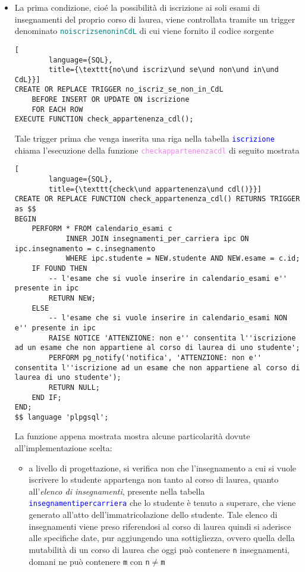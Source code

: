 \documentclass{article}
\newcommand{\tabb}[1]{\texttt{\textcolor{blue}{#1}}}
\newcommand{\sqlfunc}[1]{\texttt{\textcolor{violet}{#1}}}
\newcommand{\sqltrigger}[1]{\texttt{\textcolor{teal}{#1}}}
\newcommand{\und}[0]{\textunderscore}
\begin{document}
\begin{itemize}
    \item La prima condizione, cioé la possibilità di iscrizione ai soli esami di insegnamenti del proprio corso di laurea, viene controllata tramite un trigger denominato \sqltrigger{no\und iscriz\und se\und non\und in\und CdL} di cui viene fornito il codice sorgente
    \begin{lstlisting}[
        language={SQL},
        title={\texttt{no\und iscriz\und se\und non\und in\und CdL}}]
CREATE OR REPLACE TRIGGER no_iscriz_se_non_in_CdL
    BEFORE INSERT OR UPDATE ON iscrizione
    FOR EACH ROW
EXECUTE FUNCTION check_appartenenza_cdl();
    \end{lstlisting}
    Tale trigger prima che venga inserita una riga nella tabella \tabb{iscrizione} chiama l'esecuzione della funzione \sqlfunc{check\und appartenenza\und cdl} di seguito mostrata
    \begin{lstlisting}[
        language={SQL},
        title={\texttt{check\und appartenenza\und cdl()}}]
CREATE OR REPLACE FUNCTION check_appartenenza_cdl() RETURNS TRIGGER as $$
BEGIN
    PERFORM * FROM calendario_esami c
            INNER JOIN insegnamenti_per_carriera ipc ON ipc.insegnamento = c.insegnamento
            WHERE ipc.studente = NEW.studente AND NEW.esame = c.id;
    IF FOUND THEN
        -- l'esame che si vuole inserire in calendario_esami e'' presente in ipc
        RETURN NEW;
    ELSE
        -- l'esame che si vuole inserire in calendario_esami NON e'' presente in ipc
        RAISE NOTICE 'ATTENZIONE: non e'' consentita l''iscrizione ad un esame che non appartiene al corso di laurea di uno studente';
        PERFORM pg_notify('notifica', 'ATTENZIONE: non e'' consentita l''iscrizione ad un esame che non appartiene al corso di laurea di uno studente');
        RETURN NULL;
    END IF;
END;
$$ language 'plpgsql';
    \end{lstlisting}
    La funzione appena mostrata mostra alcune particolarità dovute all'implementazione scelta:
    \begin{itemize}
        \item a livello di progettazione, si verifica non che l'insegnamento a cui si vuole iscrivere lo studente appartenga non tanto al corso di laurea, quanto all'\textit{elenco di insegnamenti}, presente nella tabella \tabb{insegnamenti\und per\und carriera} che lo studente è tenuto a superare, che viene generato all'atto dell'immatricolazione dello studente. Tale elenco di insegnamenti viene preso riferendosi al corso di laurea quindi si aderisce alle specifiche date, pur aggiungendo una sottigliezza, ovvero quella della mutabilità di un corso di laurea che oggi può contenere \texttt{n} insegnamenti, domani ne può contenere \texttt{m} con \texttt{n}$\neq$\texttt{m}

\end{itemize}
\end{itemize}
\end{document}
